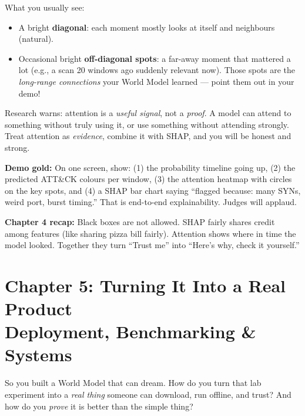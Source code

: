 \documentclass[11pt,a4paper]{article}
\begin{document}
What you usually see:
\begin{itemize}[leftmargin=1.6em,itemsep=2pt]
  \item A bright \textbf{diagonal}: each moment mostly looks at itself and
        neighbours (natural).
  \item Occasional bright \textbf{off-diagonal spots}: a far-away moment that
mattered a lot (e.g., a scan 20 windows ago suddenly relevant now).
Those spots are the \emph{long-range connections} your World Model
learned --- point them out in your demo!
\end{itemize}

\begin{warnbox}
Research warns: attention is a \emph{useful signal}, not a \emph{proof}.
A model can attend to something without truly using it, or use something
without attending strongly. Treat attention as \emph{evidence}, combine it with
SHAP, and you will be honest and strong.
\end{warnbox}

\begin{tipbox}
\textbf{Demo gold:} On one screen, show: (1) the probability timeline going
up, (2) the predicted ATT\&CK colours per window, (3) the attention heatmap
with circles on the key spots, and (4) a SHAP bar chart saying ``flagged
because: many SYNs, weird port, burst timing.'' That is end-to-end
explainability. Judges will applaud.
\end{tipbox}

\begin{recap}
\textbf{Chapter 4 recap:} Black boxes are not allowed. SHAP fairly shares
credit among features (like sharing pizza bill fairly). Attention shows where
in time the model looked. Together they turn ``Trust me'' into ``Here's why,
check it yourself.''
\end{recap}

\newpage

\section{Chapter 5: Turning It Into a Real Product \\
\small Deployment, Benchmarking \& Systems}
\label{sec:deploy}

So you built a World Model that can dream. How do you turn that lab experiment
into a \emph{real thing} someone can download, run offline, and trust? And how
do you \emph{prove} it is better than the simple thing?
\end{document}
